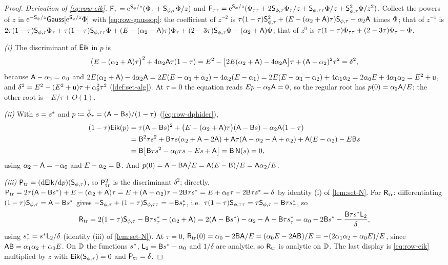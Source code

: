 \begin{proof}
\emph{Derivation of \eqref{eq:row-eik}.} $\mathsf{F}_\tau=\mathrm{e}^{\mathsf{S}_{\phi}/z}(\Phi_\tau+\mathsf{S}_{\phi,\tau}\Phi/z)$ and $\mathsf{F}_{\tau\tau}=\mathrm{e}^{\mathsf{S}_{\phi}/z}(\Phi_{\tau\tau}+2\mathsf{S}_{\phi,\tau}\Phi_\tau/z+\mathsf{S}_{\phi,\tau\tau}\Phi/z+\mathsf{S}_{\phi,\tau}^2\Phi/z^2)$. Collect the powers of $z$ in $\mathrm{e}^{-\mathsf{S}_{\phi}/z}\mathsf{Gauss}[\mathrm{e}^{\mathsf{S}_{\phi}/z}\Phi]$ with \eqref{eq:row-gaussop}: the coefficient of $z^{-2}$ is $\tau(1-\tau)\mathsf{S}_{\phi,\tau}^2+(E-(\alpha_2+\mathsf{A})\tau)\mathsf{S}_{\phi,\tau}-\alpha_2\mathsf{A}$ times $\Phi$; that of $z^{-1}$ is $2\tau(1-\tau)\mathsf{S}_{\phi,\tau}\Phi_\tau+\tau(1-\tau)\mathsf{S}_{\phi,\tau\tau}\Phi+(E-(\alpha_2+\mathsf{A})\tau)\Phi_\tau+(2-3\tau)\mathsf{S}_{\phi,\tau}\Phi-(\alpha_2+\mathsf{A})\Phi$; that of $z^0$ is $\tau(1-\tau)\Phi_{\tau\tau}+(2-3\tau)\Phi_\tau-\Phi$.

\emph{(i)} The discriminant of $\mathsf{Eik}$ in $p$ is
\[
\big(E-(\alpha_2+\mathsf{A})\tau\big)^2+4\alpha_2\mathsf{A}\tau(1-\tau)=E^2-\big[2E(\alpha_2+\mathsf{A})-4\alpha_2\mathsf{A}\big]\tau+(\mathsf{A}-\alpha_2)^2\tau^2=\delta^2,
\]
because $\mathsf{A}-\alpha_2=\alpha_0$ and $2E(\alpha_2+\mathsf{A})-4\alpha_2\mathsf{A}=2E(E-\alpha_1+\alpha_2)-4\alpha_2(E-\alpha_1)=2E(E-\alpha_1-\alpha_2)+4\alpha_1\alpha_2=2\alpha_0E+4\alpha_1\alpha_2=E^2+\mathsf{u}$, and $\delta^2=E^2-(E^2+\mathsf{u})\tau+\alpha_0^2\tau^2$ (\cref{def:set-alg}). At $\tau=0$ the equation reads $Ep-\alpha_2\mathsf{A}=0$, so the regular root has $p(0)=\alpha_2\mathsf{A}/E$; the other root is $-E/\tau+O(1)$.

\emph{(ii)} With $s=s^{\ast}$ and $p\coloneqq\breve{\phi}_\tau=(\mathsf{A}-\mathsf{B} s)/(1-\tau)$ (\eqref{eq:row-dphider}),
\begin{align*}
(1-\tau)\mathsf{Eik}(p)&=\tau(\mathsf{A}-\mathsf{B} s)^2+\big(E-(\alpha_2+\mathsf{A})\tau\big)(\mathsf{A}-\mathsf{B} s)-\alpha_2\mathsf{A}(1-\tau)\\
&=\mathsf{B}^2\tau s^2+\mathsf{B}\tau s(\alpha_2+\mathsf{A}-2\mathsf{A})+\mathsf{A}\tau(\mathsf{A}-\alpha_2-\mathsf{A}+\alpha_2)+\mathsf{A}(E-\alpha_2)-E\mathsf{B} s\\
&=\mathsf{B}\big[\mathsf{B}\tau s^2-\alpha_0\tau s-Es+\mathsf{A}\big]=\mathsf{B}\,\mathsf{N}(s)=0,
\end{align*}
using $\alpha_2-\mathsf{A}=-\alpha_0$ and $E-\alpha_2=\mathsf{B}$. And $p(0)=\mathsf{A}-\mathsf{B}\mathsf{A}/E=\mathsf{A}(E-\mathsf{B})/E=\mathsf{A}\alpha_2/E$.

\emph{(iii)} $\mathsf{P}_{\mathrm{tr}}=(\mathrm{d}\mathsf{Eik}/\mathrm{d} p)(\mathsf{S}_{\phi,\tau})$, so $\mathsf{P}_{\mathrm{tr}}^2$ is the discriminant $\delta^2$; directly, $\mathsf{P}_{\mathrm{tr}}=2\tau(\mathsf{A}-\mathsf{B}s^{\ast})+E-(\alpha_2+\mathsf{A})\tau=E+(\mathsf{A}-\alpha_2)\tau-2\mathsf{B}\tau s^{\ast}=E+\alpha_0\tau-2\mathsf{B}\tau s^{\ast}=\delta$ by identity (i) of \cref{lem:set-N}. For $\mathsf{R}_{\mathrm{tr}}$: differentiating $(1-\tau)\mathsf{S}_{\phi,\tau}=\mathsf{A}-\mathsf{B}s^{\ast}$ gives $-\mathsf{S}_{\phi,\tau}+(1-\tau)\mathsf{S}_{\phi,\tau\tau}=-\mathsf{B}s^{\ast}_\tau$, i.e.\ $\tau(1-\tau)\mathsf{S}_{\phi,\tau\tau}=\tau\mathsf{S}_{\phi,\tau}-\mathsf{B}\tau s^{\ast}_\tau$, so
\[
\mathsf{R}_{\mathrm{tr}}=2(1-\tau)\mathsf{S}_{\phi,\tau}-\mathsf{B}\tau s^{\ast}_\tau-(\alpha_2+\mathsf{A})=2(\mathsf{A}-\mathsf{B}s^{\ast})-\alpha_2-\mathsf{A}-\mathsf{B}\tau s^{\ast}_\tau=\alpha_0-2\mathsf{B}s^{\ast}-\frac{\mathsf{B}\tau s^{\ast}\mathsf{L}_2}{\delta},
\]
using $s^{\ast}_\tau=s^{\ast}\mathsf{L}_2/\delta$ (identity (iii) of \cref{lem:set-N}). At $\tau=0$, $\mathsf{R}_{\mathrm{tr}}(0)=\alpha_0-2\mathsf{B}\mathsf{A}/E=(\alpha_0E-2\mathsf{A}\mathsf{B})/E=-(2\alpha_1\alpha_2+\alpha_0E)/E$, since $\mathsf{A}\mathsf{B}=\alpha_1\alpha_2+\alpha_0E$. On $\mathbb{D}$ the functions $s^{\ast}$, $\mathsf{L}_2=\mathsf{B}s^{\ast}-\alpha_0$ and $1/\delta$ are analytic, so $\mathsf{R}_{\mathrm{tr}}$ is analytic on $\mathbb{D}$. The last display is \eqref{eq:row-eik} multiplied by $z$ with $\mathsf{Eik}(\mathsf{S}_{\phi,\tau})=0$ and $\mathsf{P}_{\mathrm{tr}}=\delta$.
\end{proof}

